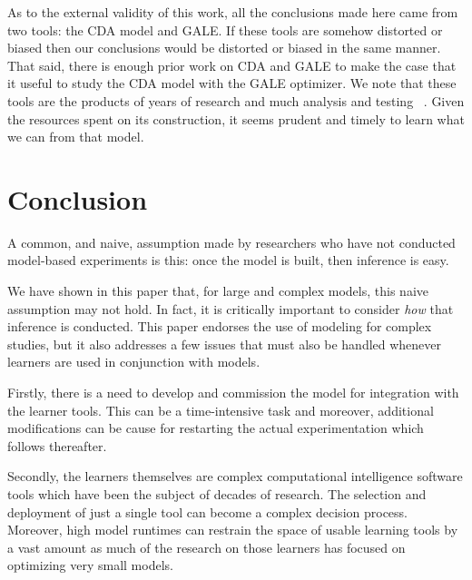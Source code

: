 \documentclass[journal]{IEEEtran}
\newcommand{\tion}[1]{\textsection\ref{sec:#1}}
\begin{document}
As to the external validity of this work,
all the conclusions made here came from two tools: the CDA model and GALE. 
If these tools are somehow distorted or biased then our conclusions would be distorted or biased in the same manner.
That said,
there is enough  prior work on CDA and GALE  to make the case that it useful to study the CDA model with the GALE optimizer.
We note that these tools are the products of years of research and much analysis and testing ~\cite{Kim2011,Pritchett2011,Feigh2012,Kim2013,Pritchett2013,Pritchett2014, Feigh2014, krall14aaai,krallphd,galepaper}. 
Given the resources spent on its construction, it seems prudent and timely to learn what we can from that model.





\section{Conclusion}

A common, and naive, assumption made by researchers who have not conducted model-based experiments is this: once the model is built, then inference is easy.

We have shown in this paper that, for large and complex models, this naive assumption may not hold.
In fact, it is critically important to consider {\em how} that inference is conducted.
This paper endorses the use of modeling for complex studies, but it also addresses a few issues that must also be handled whenever learners are used in conjunction with models.  

Firstly, there is a need to develop and commission the model for integration
with the learner tools.  
This can be a time-intensive task and moreover, additional modifications can be cause for restarting the actual experimentation which follows thereafter.  

Secondly, the learners themselves are complex computational intelligence software tools which have been the subject of decades of research.  
The selection and deployment of just a single tool can become a complex decision
process.  
Moreover, high model runtimes can restrain the space of usable learning tools by a vast amount as much of the research on those learners has focused on optimizing very small models.  
\end{document}
